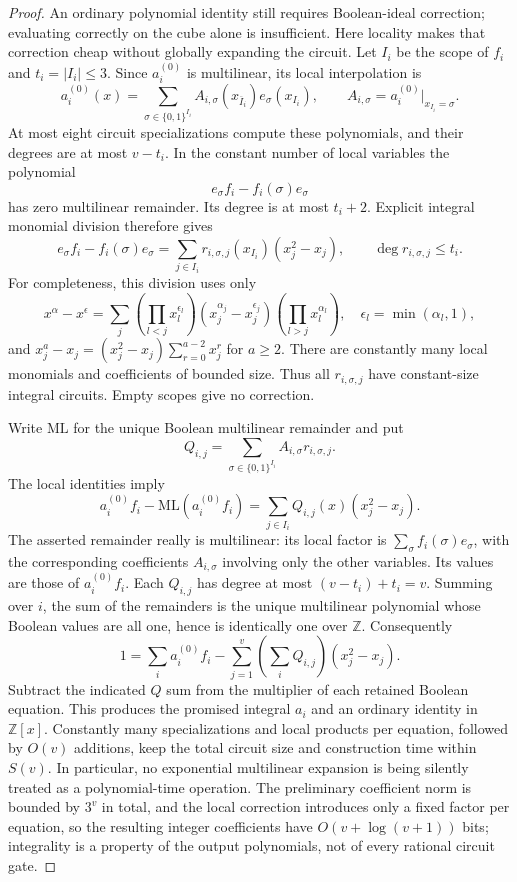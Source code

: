 \begin{proof}
An ordinary polynomial identity still requires Boolean-ideal correction; evaluating correctly on the cube alone is insufficient. Here locality makes that correction cheap without globally expanding the circuit. Let $I_i$ be the scope of $f_i$ and $t_i=|I_i|\leq3$. Since $a_i^{(0)}$ is multilinear, its local interpolation is
\[
 a_i^{(0)}(x)=\sum_{\sigma\in\{0,1\}^{I_i}}
        A_{i,\sigma}(x_{\overline I_i})e_\sigma(x_{I_i}),
 \qquad A_{i,\sigma}=a_i^{(0)}\big|_{x_{I_i}=\sigma}.
\]
At most eight circuit specializations compute these polynomials, and their degrees are at most $v-t_i$. In the constant number of local variables the polynomial
\[
       e_\sigma f_i-f_i(\sigma)e_\sigma
\]
has zero multilinear remainder. Its degree is at most $t_i+2$. Explicit integral monomial division therefore gives
\[
 e_\sigma f_i-f_i(\sigma)e_\sigma
      =\sum_{j\in I_i}r_{i,\sigma,j}(x_{I_i})(x_j^2-x_j),
      \qquad \deg r_{i,\sigma,j}\leq t_i.
\]
For completeness, this division uses only
\[
 x^\alpha-x^{\epsilon}=\sum_j
  \left(\prod_{l<j}x_l^{\epsilon_l}\right)
  (x_j^{\alpha_j}-x_j^{\epsilon_j})
  \left(\prod_{l>j}x_l^{\alpha_l}\right),
 \quad \epsilon_l=\min(\alpha_l,1),
\]
and $x_j^a-x_j=(x_j^2-x_j)\sum_{r=0}^{a-2}x_j^r$ for $a\geq2$.
There are constantly many local monomials and coefficients of bounded size. Thus all $r_{i,\sigma,j}$ have constant-size integral circuits. Empty scopes give no correction.

Write $\mathrm{ML}$ for the unique Boolean multilinear remainder and put
\[
 Q_{i,j}=\sum_{\sigma\in\{0,1\}^{I_i}}
                       A_{i,\sigma}r_{i,\sigma,j}.
\]
The local identities imply
\[
 a_i^{(0)}f_i-\mathrm{ML}(a_i^{(0)}f_i)
              =\sum_{j\in I_i}Q_{i,j}(x)(x_j^2-x_j).
\]
The asserted remainder really is multilinear: its local factor is
$\sum_\sigma f_i(\sigma)e_\sigma$, with the corresponding coefficients $A_{i,\sigma}$ involving only the other variables. Its values are those of $a_i^{(0)}f_i$. Each $Q_{i,j}$ has degree at most $(v-t_i)+t_i=v$. Summing over $i$, the sum of the remainders is the unique multilinear polynomial whose Boolean values are all one, hence is identically one over $\mathbb Z$. Consequently
\[
 1=\sum_i a_i^{(0)}f_i-
             \sum_{j=1}^v\left(\sum_i Q_{i,j}\right)(x_j^2-x_j).
\]
Subtract the indicated $Q$ sum from the multiplier of each retained Boolean equation. This produces the promised integral $a_i$ and an ordinary identity in $\mathbb Z[x]$. Constantly many specializations and local products per equation, followed by $O(v)$ additions, keep the total circuit size and construction time within $S(v)$. In particular, no exponential multilinear expansion is being silently treated as a polynomial-time operation. The preliminary coefficient norm is bounded by $3^v$ in total, and the local correction introduces only a fixed factor per equation, so the resulting integer coefficients have $O(v+\log(v+1))$ bits; integrality is a property of the output polynomials, not of every rational circuit gate.


\end{proof}
